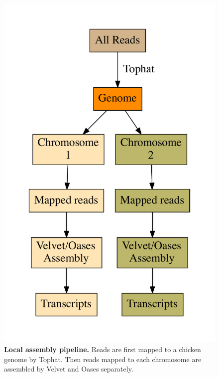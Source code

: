 \documentclass[10pt]{article}
\begin{document}
\begin{figure}[!ht]
\begin{center}
\includegraphics[width=5in]{local_assembly.pdf}
\end{center}
\caption{
{\bf Local assembly pipeline.}
Reads are first mapped to a chicken genome by Tophat.  Then reads
mapped to each chromosome are assembled by Velvet and Oases
separately.
}
\label{local_assembly}
\end{figure}
\end{document}
